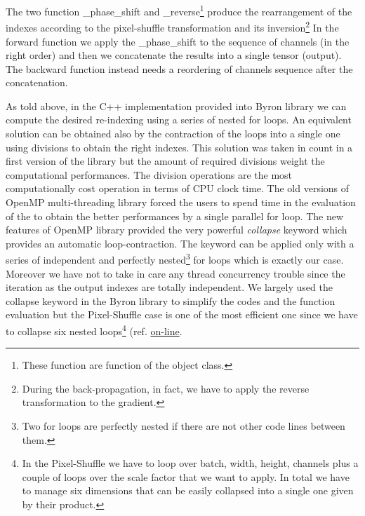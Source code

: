 \documentclass{standalone}
\begin{document}
The two function \textsf{\_phase\_shift} and \textsf{\_reverse}\footnote{
  These function are  function of the object class.
}
produce the rearrangement of the indexes according to the pixel-shuffle transformation and its inversion\footnote{
  During the back-propagation, in fact, we have to apply the reverse transformation to the gradient.
}
In the forward function we apply the \textsf{\_phase\_shift} to the sequence of channels (in the right order) and then we concatenate the results into a single tensor (output).
The backward function instead needs a reordering of channels sequence after the concatenation.

As told above, in the C++ implementation provided into Byron library we can compute the desired re-indexing using a series of nested for loops.
An equivalent solution can be obtained also by the contraction of the loops into a single one using divisions to obtain the right indexes.
This solution was taken in count in a first version of the library but the amount of required divisions weight the computational performances.
The division operations are the most computationally cost operation in terms of CPU clock time.
The old versions of OpenMP multi-threading library forced the users to spend time in the evaluation of the  to obtain the better performances by a single parallel for loop.
The new features of OpenMP library provided the very powerful \emph{collapse} keyword which provides an automatic loop-contraction.
The keyword can be applied only with a series of independent and perfectly nested\footnote{
  Two for loops are perfectly nested if there are not other code lines between them.
}
for loops which is exactly our case.
Moreover we have not to take in care any thread concurrency trouble since the iteration as the output indexes are totally independent.
We largely used the collapse keyword in the Byron library to simplify the codes and the function evaluation but the Pixel-Shuffle case is one of the most efficient one since we have to collapse six nested loops\footnote{
  In the Pixel-Shuffle we have to loop over batch, width, height, channels plus a couple of loops over the scale factor that we want to apply.
  In total we have to manage six dimensions that can be easily collapsed into a single one given by their product.
} (ref. \href{https://github.com/Nico-Curti/Byron/blob/master/src/shuffler_layer.cpp}{on-line}.
\end{document}
